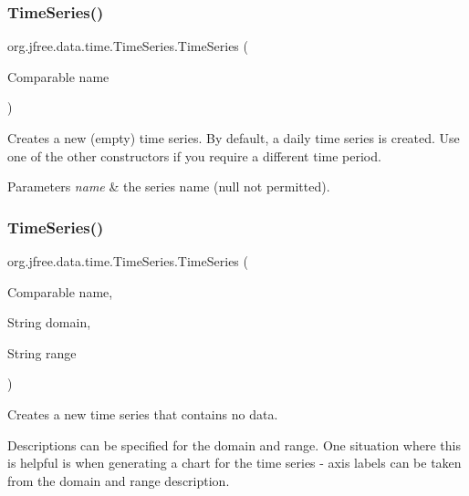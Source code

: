 \subsubsection{\texorpdfstring{Time\+Series()}{TimeSeries()}\hspace{0.1cm}{\footnotesize\ttfamily [1/4]}}
{\footnotesize\ttfamily org.\+jfree.\+data.\+time.\+Time\+Series.\+Time\+Series (\begin{DoxyParamCaption}\item[{Comparable}]{name }\end{DoxyParamCaption})}

Creates a new (empty) time series. By default, a daily time series is created. Use one of the other constructors if you require a different time period.


\begin{DoxyParams}{Parameters}
{\em name} & the series name ({\ttfamily null} not permitted). \\
\hline
\end{DoxyParams}
\mbox{\label{classorg_1_1jfree_1_1data_1_1time_1_1_time_series_a07b3d1972975d625216d9c424a3c4f6a}} 
\subsubsection{\texorpdfstring{Time\+Series()}{TimeSeries()}\hspace{0.1cm}{\footnotesize\ttfamily [2/4]}}
{\footnotesize\ttfamily org.\+jfree.\+data.\+time.\+Time\+Series.\+Time\+Series (\begin{DoxyParamCaption}\item[{Comparable}]{name,  }\item[{String}]{domain,  }\item[{String}]{range }\end{DoxyParamCaption})}

Creates a new time series that contains no data. 

Descriptions can be specified for the domain and range. One situation where this is helpful is when generating a chart for the time series -\/ axis labels can be taken from the domain and range description.


